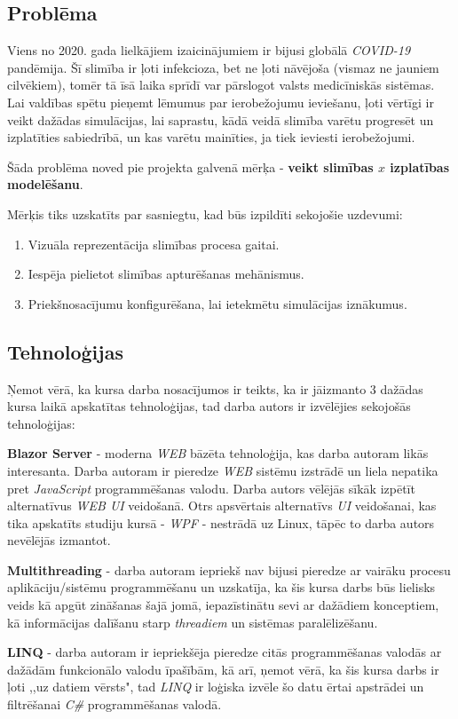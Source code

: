 
\subsection{Problēma}

Viens no 2020. gada lielkājiem izaicinājumiem ir bijusi globālā \emph{COVID-19} pandēmija.
Šī slimība ir ļoti infekcioza\cite{covid:contagious}, bet ne ļoti nāvējoša (vismaz ne jauniem cilvēkiem), tomēr
tā īsā laika sprīdī var pārslogot valsts medicīniskās sistēmas\cite{covid:medical-system-strain}. Lai valdības spētu
pieņemt lēmumus par ierobežojumu ieviešanu, ļoti vērtīgi ir veikt dažādas simulācijas,
lai saprastu, kādā veidā slimība varētu progresēt un izplatīties sabiedrībā, un kas
varētu mainīties, ja tiek ieviesti ierobežojumi.

Šāda problēma noved pie projekta galvenā mērķa - \textbf{veikt slimības \(x\) izplatības modelēšanu}.

Mērķis tiks uzskatīts par sasniegtu, kad būs izpildīti sekojošie uzdevumi:

\begin{enumerate}
    \item Vizuāla reprezentācija slimības procesa gaitai.
    \item Iespēja pielietot slimības apturēšanas mehānismus.
    \item Priekšnosacījumu konfigurēšana, lai ietekmētu simulācijas iznākumus.
\end{enumerate}

\subsection{Tehnoloģijas}

Ņemot vērā, ka kursa darba nosacījumos ir teikts, ka ir jāizmanto 3 dažādas kursa
laikā apskatītas tehnoloģijas, tad darba autors ir izvēlējies sekojošās tehnoloģijas:

\textbf{Blazor Server}\cite{blazor:info} - moderna \emph{WEB} bāzēta tehnoloģija, kas darba autoram likās interesanta.
Darba autoram ir pieredze \emph{WEB} sistēmu izstrādē un liela nepatika
pret \emph{JavaScript} programmēšanas valodu. Darba autors vēlējās sīkāk izpētīt
alternatīvus \emph{WEB UI} veidošanā. Otrs apsvērtais
alternatīvs \emph{UI} veidošanai, kas tika apskatīts studiju kursā - \emph{WPF}\cite{wpf:info} - nestrādā uz
Linux, tāpēc to darba autors nevēlējās izmantot.

\textbf{Multithreading} - darba autoram iepriekš nav bijusi pieredze ar vairāku procesu
aplikāciju/sistēmu programmēšanu un uzskatīja, ka šis kursa darbs būs lielisks
veids kā apgūt zināšanas šajā jomā, iepazīstinātu sevi ar dažādiem konceptiem, kā
informācijas dalīšanu starp \emph{threadiem} un sistēmas paralēlizēšanu.

\textbf{LINQ}\cite{linq:info} - darba autoram ir iepriekšēja pieredze citās programmēšanas
valodās ar dažādām funkcionālo valodu īpašībām, kā arī, ņemot vērā, ka šis
kursa darbs ir ļoti ,,uz datiem vērsts", tad \emph{LINQ} ir loģiska izvēle šo datu
ērtai apstrādei un filtrēšanai \emph{C\#} programmēšanas valodā.

